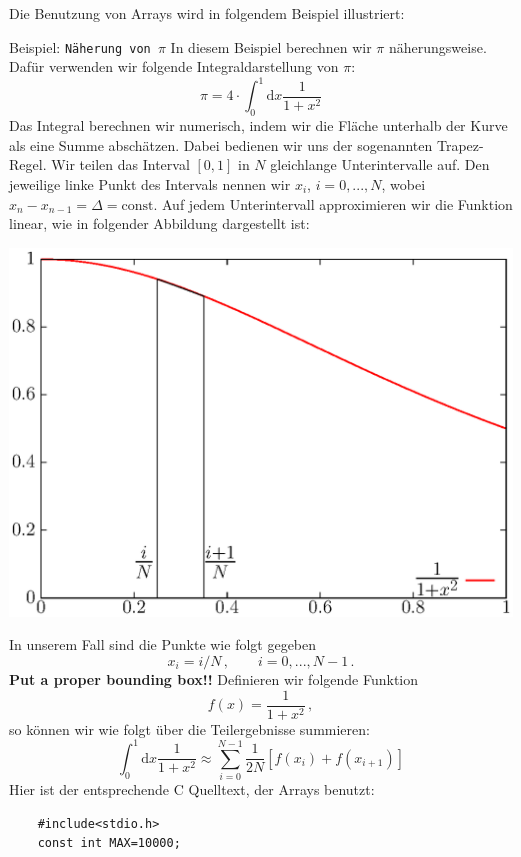 Die Benutzung von Arrays wird in folgendem Beispiel illustriert:
\begin{myexampleprogram}{Beispiel: \texttt{Näherung von $\pi$}}
  In diesem Beispiel berechnen wir $\pi$ näherungsweise.
  Dafür verwenden wir folgende Integraldarstellung von $\pi$:
  \begin{equation}
    \pi=4\cdot \int_{0}^{1} \mathrm{d}x \dfrac{1}{1+x^2}
  \end{equation}
  Das Integral berechnen wir numerisch, indem wir die Fläche unterhalb der Kurve als eine Summe abschätzen. 
  Dabei bedienen wir uns der sogenannten Trapez-Regel.
  Wir teilen das Interval $[0,1]$ in $N$ gleichlange Unterintervalle auf.
  Den jeweilige linke Punkt des Intervals nennen wir $x_i$, $i=0,...,N$, wobei $x_n-x_{n-1}=\Delta=\mathrm{const}$.
  Auf jedem Unterintervall approximieren wir die Funktion linear, wie in folgender Abbildung dargestellt ist:
  \vspace{-2cm}
  \begin{center}
    \includegraphics[width=.8\linewidth]{trapez1.ps}
  \end{center}
  \vspace{-2.5cm}
  In unserem Fall sind die Punkte wie folgt gegeben
  \begin{displaymath}
    x_i = i/N\,,\qquad i = 0, ..., N-1\,.
  \end{displaymath}
  \textbf{Put a proper bounding box!!}
  Definieren wir folgende Funktion
  \[
  f(x) = \frac{1}{1+x^2}\,,
  \]
  so können wir wie folgt über die Teilergebnisse summieren:
  \begin{equation}
    \int_{0}^{1} \mathrm{d}x \dfrac{1}{1+x^2}\approx \sum_{i=0}^{N-1}\frac{1}{2N}[f(x_i)+f(x_{i+1})]
  \end{equation}
  Hier ist der entsprechende C Quelltext, der Arrays benutzt:
  \begin{lstlisting}
    #include<stdio.h>
    const int MAX=10000;


\end{lstlisting}
\end{myexampleprogram}
